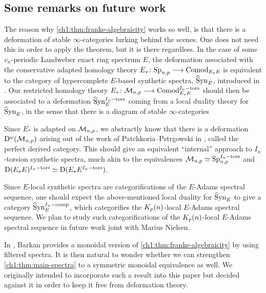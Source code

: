 



\subsection*{Some remarks on future work}

The reason why \cref{ch1:thm:franke-algebraicity} works so well, is that there is a deformation of stable $\infty$-categories lurking behind the scenes. One does not need this in order to apply the theorem, but it is there regardless. In the case of some $v_n$-periodic Landweber exact ring spectrum $E$, the deformation associated with the conservative adapted homology theory $E_*\colon \mathrm{Sp}_{n,p} \longrightarrow \mathrm{Comod}_{E_*E}$ is equivalent to the category of hypercomplete $E$-based synthetic spectra, $\widehat{\mathrm{S}}\mathrm{yn}_{E}$, introduced in \cite{pstragowski_2022}. Our restricted homology theory $E_*\colon \mathcal{M}_{n,p}\longrightarrow \mathrm{Comod}_{E_*E}^{I_n-\mathrm{tors}}$ should then be associated to a deformation $\widehat{\mathrm{S}}\mathrm{yn}_{E}^{I_n-\mathrm{tors}}$ coming from a local duality theory for $\widehat{\mathrm{S}}\mathrm{yn}_{E}$, in the sense that there is a diagram of stable $\infty$-categories 
\begin{center}
\end{center}
Since $E_*$ is adapted on $\mathcal{M}_{n,p}$, we abstractly know that there is a deformation $\mathrm{D}^\omega(\mathcal{M}_{n,p})$ arising out of the work of Patchkoria--Pstr\a{}gowski in \cite{patchkoria-pstragowski_2021}, called the perfect derived category. This should give an equivalent ``internal'' approach to $I_n$-torsion synthetic spectra, much akin to the equivalences $\mathcal{M}_{n,p}\simeq \mathrm{Sp}_{n,p}^{I_n-\mathrm{tors}}$ and $\mathrm{D}(E_*E)^{I_n-\mathrm{tors}}\simeq \mathrm{D}(E_*E^{I_n-\mathrm{tors}})$. 

Since $E$-local synthetic spectra are categorifications of the $E$-Adams spectral sequence, one should expect the above-mentioned local duality for $\widehat{\mathrm{S}}\mathrm{yn}_{E}$ to give a category $\widehat{\mathrm{S}}\mathrm{yn}_{E}^{I_n-\mathrm{comp}}$, which categorifies the ${K_p(n)}$-local $E$-Adams spectral sequence. We plan to study such categorifications of the ${K_p(n)}$-local $E$-Adams spectral sequence in future work joint with Marius Nielsen.

In \cite{barkan_2023}, Barkan provides a monoidal version of \cref{ch1:thm:franke-algebraicity} by using filtered spectra. It is then natural to wonder whether we can strengthen \cref{ch1:thm:main-spectra} to a symmetric monoidal equivalence as well. We originally intended to incorporate such a result into this paper but decided against it in order to keep it free from deformation theory. 

